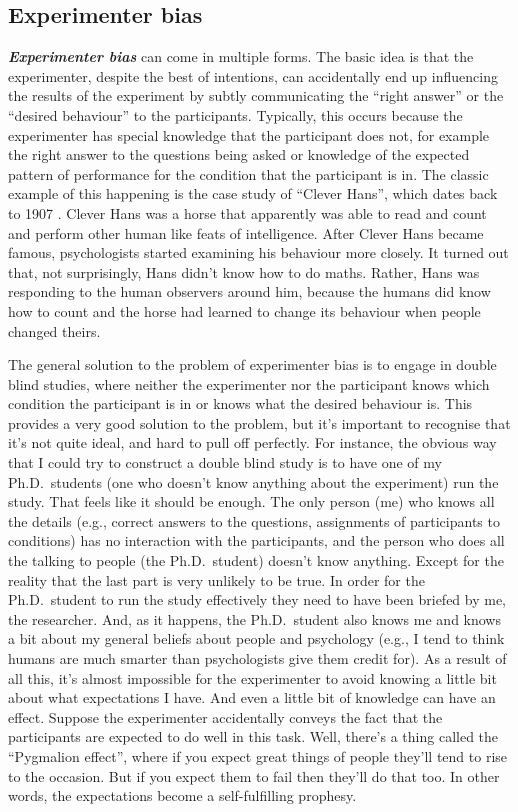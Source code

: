 \documentclass[
]{book}
\begin{document}
\hypertarget{experimenter-bias}{%
\subsection{Experimenter bias}\label{experimenter-bias}}

\textbf{\emph{Experimenter bias}} can come in multiple forms. The basic idea is that the experimenter, despite the best of intentions, can accidentally end up influencing the results of the experiment by subtly communicating the ``right answer'' or the ``desired behaviour'' to the participants. Typically, this occurs because the experimenter has special knowledge that the participant does not, for example the right answer to the questions being asked or knowledge of the expected pattern of performance for the condition that the participant is in. The classic example of this happening is the case study of ``Clever Hans'', which dates back to 1907 \citep{Pfungst1911, Hothersall2004}. Clever Hans was a horse that apparently was able to read and count and perform other human like feats of intelligence. After Clever Hans became famous, psychologists started examining his behaviour more closely. It turned out that, not surprisingly, Hans didn't know how to do maths. Rather, Hans was responding to the human observers around him, because the humans did know how to count and the horse had learned to change its behaviour when people changed theirs.

The general solution to the problem of experimenter bias is to engage in double blind studies, where neither the experimenter nor the participant knows which condition the participant is in or knows what the desired behaviour is. This provides a very good solution to the problem, but it's important to recognise that it's not quite ideal, and hard to pull off perfectly. For instance, the obvious way that I could try to construct a double blind study is to have one of my Ph.D.~students (one who doesn't know anything about the experiment) run the study. That feels like it should be enough. The only person (me) who knows all the details (e.g., correct answers to the questions, assignments of participants to conditions) has no interaction with the participants, and the person who does all the talking to people (the Ph.D.~student) doesn't know anything. Except for the reality that the last part is very unlikely to be true. In order for the Ph.D.~student to run the study effectively they need to have been briefed by me, the researcher. And, as it happens, the Ph.D.~student also knows me and knows a bit about my general beliefs about people and psychology (e.g., I tend to think humans are much smarter than psychologists give them credit for). As a result of all this, it's almost impossible for the experimenter to avoid knowing a little bit about what expectations I have. And even a little bit of knowledge can have an effect. Suppose the experimenter accidentally conveys the fact that the participants are expected to do well in this task. Well, there's a thing called the ``Pygmalion effect'', where if you expect great things of people they'll tend to rise to the occasion. But if you expect them to fail then they'll do that too. In other words, the expectations become a self-fulfilling prophesy.
\end{document}
